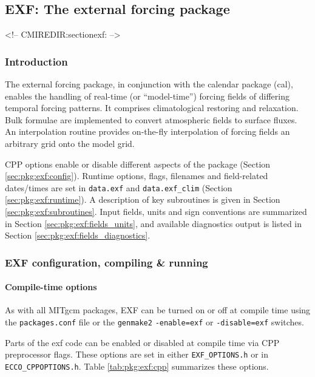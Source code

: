 \subsection{EXF: The external forcing package
\label{sec:pkg:exf}}
\begin{rawhtml}
<!-- CMIREDIR:sectionexf: -->
\end{rawhtml}


\subsubsection{Introduction
\label{sec:pkg:exf:intro}}

The external forcing package, in conjunction with the
calendar package (cal), enables the handling of real-time
(or ``model-time'') forcing
fields of differing temporal forcing patterns.
It comprises climatological restoring and relaxation.
Bulk formulae are implemented to convert atmospheric fields
to surface fluxes.
An interpolation routine provides on-the-fly interpolation of
forcing fields an arbitrary grid onto the model grid.

CPP options enable or disable different aspects of the package
(Section \ref{sec:pkg:exf:config}).
Runtime options, flags, filenames and field-related dates/times are
set in \texttt{data.exf} and \texttt{data.exf\_clim}
(Section \ref{sec:pkg:exf:runtime}).
A description of key subroutines is given in Section
\ref{sec:pkg:exf:subroutines}.
Input fields, units and sign conventions are summarized in
Section \ref{sec:pkg:exf:fields_units}, and available diagnostics
output is listed in Section \ref{sec:pkg:exf:fields_diagnostics}.


\subsubsection{EXF configuration, compiling \& running}

\paragraph{Compile-time options
\label{sec:pkg:exf:config}}

As with all MITgcm packages, EXF can be turned on or off at compile time
using the \texttt{packages.conf} file or the \texttt{genmake2}
\texttt{-enable=exf} or \texttt{-disable=exf} switches.

Parts of the exf code can be enabled or disabled at compile time
via CPP preprocessor flags. These options are set in either
\texttt{EXF\_OPTIONS.h} or in \texttt{ECCO\_CPPOPTIONS.h}.
Table \ref{tab:pkg:exf:cpp} summarizes these options.

